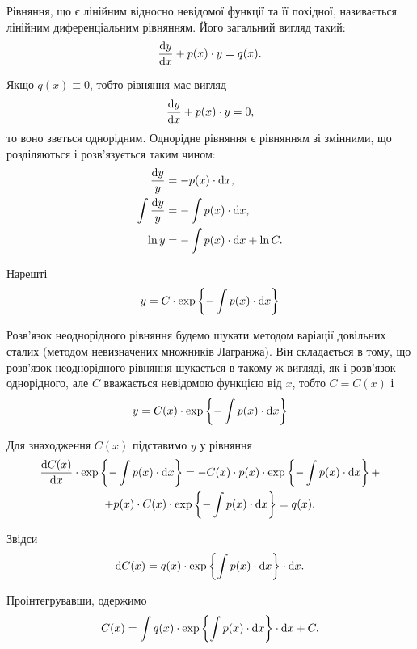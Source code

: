 Рівняння, що є лінійним відносно невідомої функції та її похідної, називається лінійним диференціальним рівнянням. Його загальний вигляд такий:
\begin{equation*}
	\frac{\mathop{}\!\mathrm{d} y}{\mathop{}\!\mathrm{d} x} + p(x) \cdot y = q(x).
\end{equation*}

Якщо $q(x) \equiv 0$, тобто рівняння має вигляд
\begin{equation*}
	\frac{\mathop{}\!\mathrm{d} y}{\mathop{}\!\mathrm{d} x} + p(x) \cdot y = 0,
\end{equation*}
то воно зветься однорідним. Однорідне рівняння є рівнянням зі змінними, що розділяються і розв'язується таким чином:
\begin{align*}
	\frac{\mathop{}\!\mathrm{d} y}{y} &= -p(x) \cdot \mathop{}\!\mathrm{d} x, \\
	\int \frac{\mathop{}\!\mathrm{d} y}{y} &= - \int p(x) \cdot \mathop{}\!\mathrm{d} x, \\
	\ln y &= - \int p(x) \cdot \mathop{}\!\mathrm{d} x + \ln C.
\end{align*}

Нарешті 
\begin{equation*}
	y = C \cdot \exp \left\{ - \int p(x) \cdot \mathop{}\!\mathrm{d} x \right\}
\end{equation*}

Розв'язок неоднорідного рівняння будемо шукати методом варіації довільних сталих (методом невизначених множників Лагранжа). Він складається в тому, що розв'язок неоднорідного рівняння шукається в такому ж вигляді, як і розв'язок однорідного, але $C$ вважається невідомою функцією від $x$, тобто $C = C(x)$ і 
\begin{equation*}
	y = C(x) \cdot \exp \left\{ - \int p(x) \cdot \mathop{}\!\mathrm{d} x \right\}	
\end{equation*}

Для знаходження $C(x)$ підставимо $y$ у рівняння
\begin{multline*} 
	\frac{\mathop{}\!\mathrm{d} C(x)}{\mathop{}\!\mathrm{d} x} \cdot \exp \left\{ - \int p(x) \cdot \mathop{}\!\mathrm{d} x \right\} = - C(x) \cdot p(x) \cdot \exp \left\{ - \int p(x) \cdot \mathop{}\!\mathrm{d} x \right\} + \\
	+ p(x) \cdot C(x) \cdot \exp \left\{ - \int p(x) \cdot \mathop{}\!\mathrm{d} x \right\} = q(x).
\end{multline*}

Звідси
\begin{equation*} 
	\mathop{}\!\mathrm{d} C(x) = q(x) \cdot \exp \left\{\int p(x) \cdot \mathop{}\!\mathrm{d} x \right\} \cdot \mathop{}\!\mathrm{d} x.
\end{equation*}

Проінтегрувавши, одержимо
\begin{equation*} 
	C(x) = \int q(x) \cdot \exp \left\{\int p(x) \cdot \mathop{}\!\mathrm{d} x \right\} \cdot \mathop{}\!\mathrm{d} x + C.
\end{equation*}

